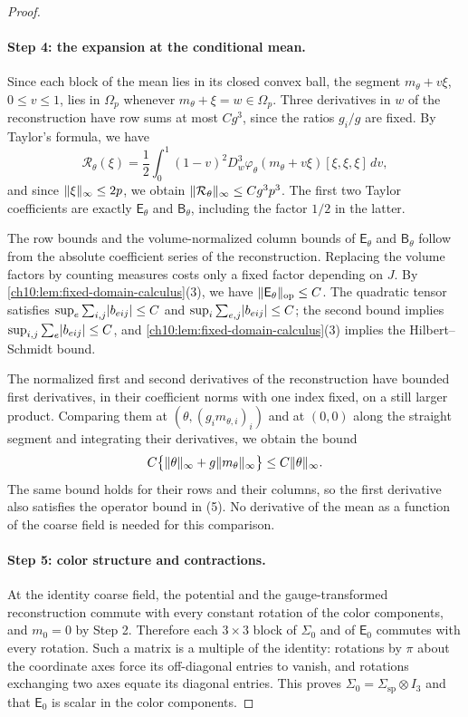 \begin{proof}
\paragraph{Step 4: the expansion at the conditional mean.}
Since each block of the mean lies in its closed convex ball, the segment $m_\theta+v\xi$, $0\le v\le1$, lies in $\Omega_p$ whenever $m_\theta+\xi=w\in\Omega_p$. Three derivatives in $w$ of the reconstruction have row sums at most $Cg^3$, since the ratios $g_i/g$ are fixed. By Taylor's formula, we have
\[
 \mathcal R_\theta(\xi)=\frac12\int_0^1(1-v)^2D_w^3\varphi_\theta(m_\theta+v\xi)[\xi,\xi,\xi]\,dv,
\]
and since $\lVert \xi\rVert_\infty\le2p$, we obtain $\lVert \mathcal R_\theta\rVert_\infty\le Cg^3p^3$. The first two Taylor coefficients are exactly $\mathsf E_\theta$ and $\mathsf B_\theta$, including the factor $1/2$ in the latter.

The row bounds and the volume-normalized column bounds of $\mathsf E_\theta$ and $\mathsf B_\theta$ follow from the absolute coefficient series of the reconstruction. Replacing the volume factors by counting measures costs only a fixed factor depending on $J$. By \cref{ch10:lem:fixed-domain-calculus}(3), we have $\lVert \mathsf E_\theta\rVert_{\mathrm{op}}\le C$. The quadratic tensor satisfies $\sup_e\sum_{i,j}\lvert b_{eij}\rvert\le C$ and $\sup_i\sum_{e,j}\lvert b_{eij}\rvert\le C$; the second bound implies $\sup_{i,j}\sum_e\lvert b_{eij}\rvert\le C$, and \cref{ch10:lem:fixed-domain-calculus}(3) implies the Hilbert--Schmidt bound.

The normalized first and second derivatives of the reconstruction have bounded first derivatives, in their coefficient norms with one index fixed, on a still larger product. Comparing them at $(\theta,(g_im_{\theta,i})_i)$ and at $(0,0)$ along the straight segment and integrating their derivatives, we obtain the bound
\[
 C\bigl\{\lVert \theta\rVert_\infty+g\lVert m_\theta\rVert_\infty\bigr\}\le C\lVert \theta\rVert_\infty.
\]
The same bound holds for their rows and their columns, so the first derivative also satisfies the operator bound in (5). No derivative of the mean as a function of the coarse field is needed for this comparison.

\paragraph{Step 5: color structure and contractions.}
At the identity coarse field, the potential and the gauge-transformed reconstruction commute with every constant rotation of the color components, and $m_0=0$ by Step 2. Therefore each $3\times3$ block of $\Sigma_0$ and of $\mathsf E_0$ commutes with every rotation. Such a matrix is a multiple of the identity: rotations by $\pi$ about the coordinate axes force its off-diagonal entries to vanish, and rotations exchanging two axes equate its diagonal entries. This proves $\Sigma_0=\Sigma_{\mathrm{sp}}\otimes I_3$ and that $\mathsf E_0$ is scalar in the color components.


\end{proof}
